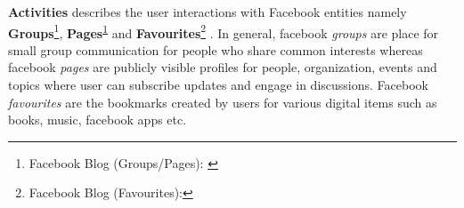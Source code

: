 


{\bf Activities} describes the user interactions with Facebook entities namely \textbf{Groups}\footnote{Facebook Blog (Groups/Pages): \label{fn:fbblog}},
\textbf{Pages}\textsuperscript{\ref{fn:fbblog}} and \textbf{Favourites}\footnote{Facebook Blog (Favourites): } .
In general, facebook \textit{groups} are place for small group communication for people who share common interests whereas facebook \textit{pages} are publicly visible profiles for people, organization, events and
topics where user can subscribe updates and engage in discussions. Facebook \textit{favourites} are the bookmarks created by users for various digital items such as books, music, facebook apps etc.


